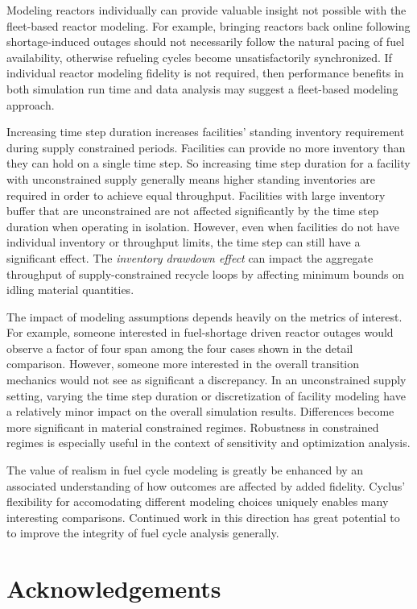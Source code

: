 \documentclass{style}
\begin{document}
Modeling reactors individually can provide valuable insight not possible with
the fleet-based reactor modeling.  For example, bringing reactors back online
following shortage-induced outages should not necessarily follow the natural
pacing of fuel availability, otherwise refueling cycles become
unsatisfactorily synchronized.  If individual reactor modeling fidelity is not
required, then performance benefits in both simulation run time and data
analysis may suggest a fleet-based modeling approach.

Increasing time step duration increases facilities' standing inventory
requirement during supply constrained periods.  Facilities can provide no more
inventory than they can hold on a single time step.  So increasing time step
duration for a facility with unconstrained supply generally means higher
standing inventories are required in order to achieve equal throughput.
Facilities with large inventory buffer that are unconstrained are not affected
significantly by the time step duration when operating in isolation.  However,
even when facilities do not have individual inventory or throughput limits,
the time step can still have a significant effect. The \emph{inventory drawdown
effect} can impact the aggregate throughput of supply-constrained recycle loops by affecting
minimum bounds on idling material quantities.

The impact of modeling assumptions depends heavily on the metrics of interest.
For example, someone interested in fuel-shortage driven reactor outages would
observe a factor of four span among the four cases shown in the detail
comparison.  However, someone more interested in the overall transition
mechanics would not see as significant a discrepancy.  In an unconstrained
supply setting, varying the time step duration or discretization of facility
modeling have a relatively minor impact on the overall simulation results.
Differences become more significant in material constrained regimes.
Robustness in constrained regimes is especially useful in the context of
sensitivity and optimization analysis.

The value of realism in fuel cycle modeling is greatly be enhanced by an
associated understanding of how outcomes are affected by added fidelity.
Cyclus' flexibility for accomodating different modeling choices uniquely
enables many interesting comparisons.  Continued work in this direction has
great potential to to improve the integrity of fuel cycle analysis generally.

\section{Acknowledgements}
\end{document}
